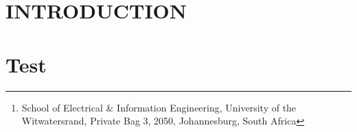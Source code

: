\documentclass[10pt,twocolumn]{witseiepaper}
\begin{document}
\title{}

\author{Jacques Visser and Anthony Farquharson
\thanks{School of Electrical \& Information Engineering, University of the
Witwatersrand, Private Bag 3, 2050, Johannesburg, South Africa}
}

\abstract{}

\keywords{}

\maketitle
\thispagestyle{empty}\pagestyle{empty}


\section{INTRODUCTION}

\section{Test}

\cite{zhu2014automatic}


 
\end{document}
